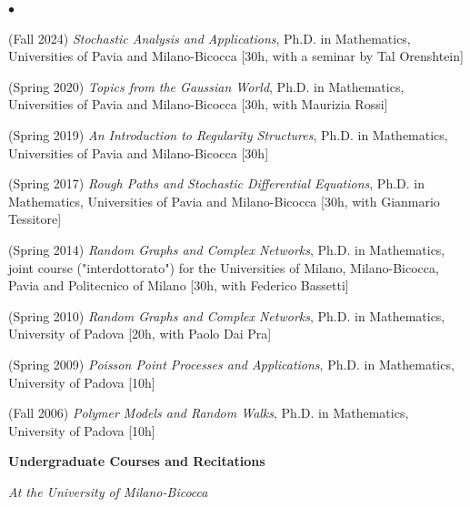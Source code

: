 \documentclass[a4paper,11pt,oneside]{amsart}
\newenvironment{myitemize}{%
\begin{list}{$\bullet$}%
 	{%
	\setlength{\itemsep}{0.3em}%
	\setlength{\topsep}{0.3em}%
	\setlength{\partopsep}{0em}%
	\setlength{\parsep}{0em}%
	\setlength{\parskip}{0em}%
	\setlength\leftmargin{1.5em}%
	\setlength\labelwidth{1.1em}%
	\setlength{\labelsep}{0.4em}%
	}%
	}%
{\end{list}}
\renewenvironment{itemize}{
\begin{myitemize}}%
{\end{myitemize}}
\begin{document}
\begin{itemize}
\item (Fall 2024)
\textit{Stochastic Analysis and Applications},
Ph.D. in Mathematics, Universities of
Pavia and Milano-Bicocca [30h, with a seminar by Tal Orenshtein]

\item (Spring 2020)
\textit{Topics from the Gaussian World},
Ph.D. in Mathematics, Universities of
Pavia and Milano-Bicocca [30h, with Maurizia Rossi]

\item (Spring 2019)
\textit{An Introduction to Regularity Structures},
Ph.D. in Mathematics, Universities of
Pavia and Milano-Bicocca [30h]

\item (Spring 2017)
\textit{Rough Paths and Stochastic Differential Equations},
Ph.D. in Mathematics, Universities of Pavia and
Milano-Bicocca [30h, with Gianmario Tessitore]

\item (Spring 2014)
\textit{Random Graphs and Complex Networks},
Ph.D. in Mathematics, joint course ("interdottorato") for the Universities of
Milano, Milano-Bicocca, Pavia and Politecnico of Milano
[30h, with Federico Bassetti]

\item (Spring 2010) 
\textit{Random Graphs and Complex Networks},
Ph.D. in Mathematics, University of Padova
[20h, with Paolo Dai Pra]

\item (Spring 2009)
\emph{Poisson Point Processes and Applications},
Ph.D. in Mathematics, University of Padova
[10h]

\item (Fall 2006)
\emph{Polymer Models and Random Walks},
Ph.D. in Mathematics, University of Padova [10h]
\end{itemize}



\medskip
{\large\sf \bfseries Undergraduate Courses and Recitations}
\smallskip

\smallskip
\emph{At the University of Milano-Bicocca}
\end{document}
